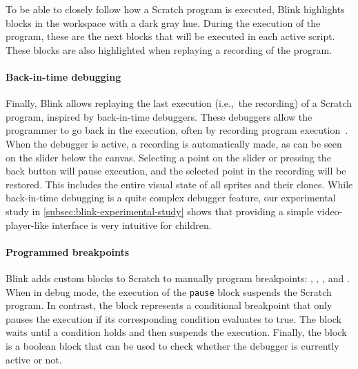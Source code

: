 \documentclass[../main]{subfiles}
\begin{document}
To be able to closely follow how a Scratch program is executed, Blink highlights blocks in the workspace with a dark gray hue.
During the execution of the program, these are the next blocks that will be executed in each active script.
These blocks are also highlighted when replaying a recording of the program.

\paragraph{Back-in-time debugging}
Finally, Blink allows replaying the last execution (i.e.,\ the recording) of a Scratch program, inspired by back-in-time debuggers.
These debuggers allow the programmer to go back in the execution, often by recording program execution~\autocite{barrTardisAffordableTimetravel2014a,barrTimetravelDebuggingJavaScript2016a,czaplickiAsynchronousFunctionalReactive2013a,balzerEXDAMSExtendableDebugging1969,ungarDebuggingExperienceImmediacy1997,chenReversibleDebuggingUsing2001,crescenziReversibleExecutionVisualization2000}.
When the debugger is active, a recording is automatically made, as can be seen on the slider below the canvas.
Selecting a point on the slider or pressing the back button will pause execution, and the selected point in the recording will be restored.
This includes the entire visual state of all sprites and their clones.
While back-in-time debugging is a quite complex debugger feature, our experimental study in \vref{subsec:blink-experimental-study} shows that providing a simple video-player-like interface is very intuitive for children.

\paragraph{Programmed breakpoints}
Blink adds custom blocks to Scratch to manually program breakpoints: , , , and .
When in debug mode, the execution of the \texttt{pause} block suspends the Scratch program.
In contrast, the  block represents a conditional breakpoint that only pauses the execution if its corresponding condition evaluates to true.
The  block waits until a condition holds and then suspends the execution.
Finally, the  block is a boolean block that can be used to check whether the debugger is currently active or not.
\end{document}
